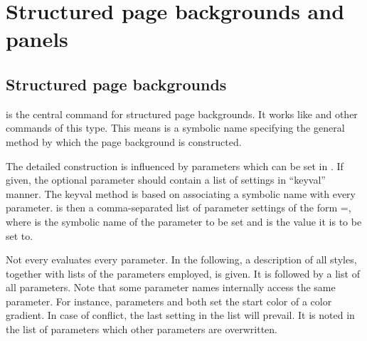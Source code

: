 \documentclass[12pt]{scrartcl}
\let\newslide=\relax
\begin{document}
  \newslide


  \section{Structured page backgrounds and panels}\label{Sec:PageBackPanel}
  \subsection{Structured page backgrounds}

  is the central command for structured page backgrounds. It works like
   and other commands of this type. This means
   is a symbolic name specifying the general method by which the
  page background is constructed.

  The detailed construction is influenced by parameters which can be set in
  . If given, the optional parameter  should
  contain a list of settings in ``keyval'' manner. The keyval method
  is based on associating a symbolic name with every parameter. 
  is then a comma-separated list of parameter settings of the form
  =, where  is the symbolic name of the
  parameter to be set and  is the value it is to be set to.

  Not every  evaluates every parameter. In the following, a
  description of all styles, together with lists of the parameters employed, is
  given. It is followed by a list of all parameters. Note that some parameter
  names internally access the same parameter. For instance, parameters
   and  both set the start color of a color
  gradient. In case of conflict, the last setting in the list 
  will prevail. It is noted in the list of parameters which other parameters
  are overwritten.

  \newslide
\end{document}
